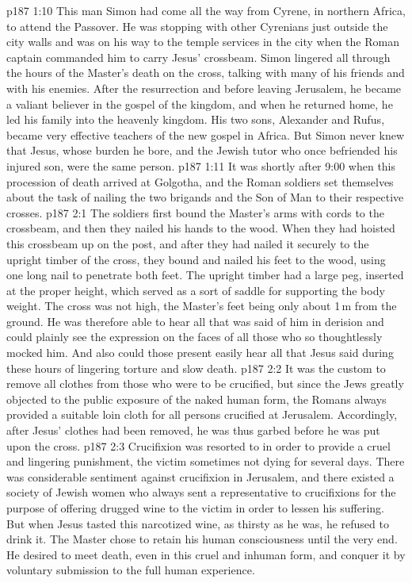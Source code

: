 \vs p187 1:10 \pc This man Simon had come all the way from Cyrene, in northern Africa, to attend the Passover. He was stopping with other Cyrenians just outside the city walls and was on his way to the temple services in the city when the Roman captain commanded him to carry Jesus’ crossbeam. Simon lingered all through the hours of the Master’s death on the cross, talking with many of his friends and with his enemies. After the resurrection and before leaving Jerusalem, he became a valiant believer in the gospel of the kingdom, and when he returned home, he led his family into the heavenly kingdom. His two sons, Alexander and Rufus, became very effective teachers of the new gospel in Africa. But Simon never knew that Jesus, whose burden he bore, and the Jewish tutor who once befriended his injured son, were the same person.
\vs p187 1:11 \pc It was shortly after 9:00 when this procession of death arrived at Golgotha, and the Roman soldiers set themselves about the task of nailing the two brigands and the Son of Man to their respective crosses.
\vs p187 2:1 The soldiers first bound the Master’s arms with cords to the crossbeam, and then they nailed his hands to the wood. When they had hoisted this crossbeam up on the post, and after they had nailed it securely to the upright timber of the cross, they bound and nailed his feet to the wood, using one long nail to penetrate both feet. The upright timber had a large peg, inserted at the proper height, which served as a sort of saddle for supporting the body weight. The cross was not high, the Master’s feet being only about 1\,m from the ground. He was therefore able to hear all that was said of him in derision and could plainly see the expression on the faces of all those who so thoughtlessly mocked him. And also could those present easily hear all that Jesus said during these hours of lingering torture and slow death.
\vs p187 2:2 It was the custom to remove all clothes from those who were to be crucified, but since the Jews greatly objected to the public exposure of the naked human form, the Romans always provided a suitable loin cloth for all persons crucified at Jerusalem. Accordingly, after Jesus’ clothes had been removed, he was thus garbed before he was put upon the cross.
\vs p187 2:3 Crucifixion was resorted to in order to provide a cruel and lingering punishment, the victim sometimes not dying for several days. There was considerable sentiment against crucifixion in Jerusalem, and there existed a society of Jewish women who always sent a representative to crucifixions for the purpose of offering drugged wine to the victim in order to lessen his suffering. But when Jesus tasted this narcotized wine, as thirsty as he was, he refused to drink it. The Master chose to retain his human consciousness until the very end. He desired to meet death, even in this cruel and inhuman form, and conquer it by voluntary submission to the full human experience.
